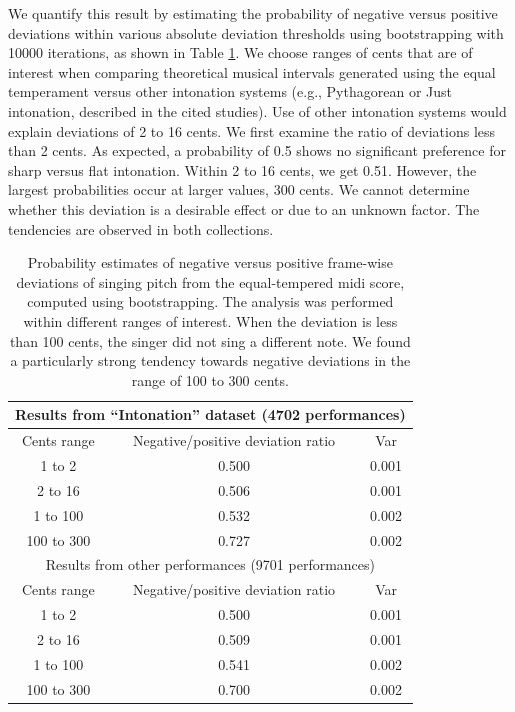 We quantify this result by estimating the probability of negative versus positive deviations within various absolute deviation thresholds using bootstrapping \cite{efron1994introduction} with 10000 iterations, as shown in Table \ref{table:1}. We choose ranges of cents that are of interest when comparing theoretical musical intervals generated using the equal temperament versus other intonation systems (e.g., Pythagorean or Just intonation, described in the cited studies). Use of other intonation systems would explain deviations of 2 to 16 cents. We first examine the ratio of deviations less than 2 cents. As expected, a probability of 0.5 shows no significant preference for sharp versus flat intonation. Within 2 to 16 cents, we get 0.51. However, the largest probabilities occur at larger values, 300 cents. We cannot determine whether this deviation is a desirable effect or due to an unknown factor. The tendencies are observed in both collections. 


\begin{table}[t!]
\centering
\begin{tabular}{ |c|c|c| } 
\hline
\multicolumn{3}{|c|}{Results from ``Intonation'' dataset (4702 performances)}\\
\hline\hline
Cents range & Negative/positive deviation ratio & Var \\
\hline
1 to 2 & 0.500 & 0.001 \\ 
2 to 16 & 0.506 & 0.001 \\ 
1 to 100 & 0.532 & 0.002\\ 
100 to 300 & 0.727 & 0.002\\ 
\hline\hline
\multicolumn{3}{|c|}{Results from other performances (9701 performances)}\\
\hline\hline
Cents range & Negative/positive deviation ratio & Var \\
\hline
1 to 2 & 0.500 & 0.001 \\ 
2 to 16 & 0.509 & 0.001 \\ 
1 to 100 & 0.541 & 0.002\\ 
100 to 300 & 0.700 & 0.002\\ 
\hline
\end{tabular}
\caption{Probability estimates of negative versus positive frame-wise deviations of singing pitch from the equal-tempered \gls{midi} score, computed using bootstrapping. The analysis was performed within different ranges of interest. When the deviation is less than 100 cents, the singer did not sing a different note. We found a particularly strong tendency towards negative deviations in the range of 100 to 300 cents.}
\label{table:1}
\end{table}

